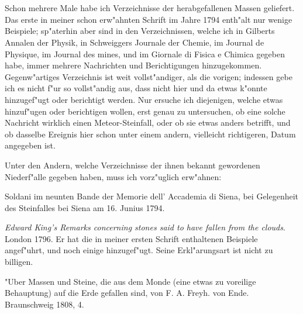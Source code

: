 \documentclass[a4paper, 11pt, oneside, polutonikogreek, german]{article}
\begin{document}
\section{}
\paragraph{}
\subsection{}
\paragraph{}
Schon mehrere Male habe ich Verzeichnisse der herabgefallenen Massen geliefert. Das erste in meiner schon erw"ahnten Schrift im Jahre 1794 enth"alt nur wenige Beispiele; sp"aterhin aber sind in den Verzeichnissen, welche ich in Gilberts Annalen der Physik, in Schweiggers Journale der Chemie, im Journal de Physique, im Journal des mines, und im Giornale di Fisica e Chimica gegeben habe, immer mehrere Nachrichten und Berichtigungen hinzugekommen. Gegenw"artiges Verzeichnis ist weit vollst"andiger, als die vorigen; indessen gebe ich es nicht f"ur so vollst"andig aus, dass nicht hier und da etwas k"onnte hinzugef"ugt oder berichtigt werden. Nur ersuche ich diejenigen, welche etwas hinzuf"ugen oder berichtigen wollen, erst genau zu untersuchen, ob eine solche Nachricht wirklich einen Meteor-Steinfall, oder ob sie etwas anders betrifft, und ob dasselbe Ereignis hier schon unter einem andern, vielleicht richtigeren, Datum angegeben ist.

Unter den Andern, welche Verzeichnisse der ihnen bekannt gewordenen Niederf"alle gegeben haben, muss ich vorz"uglich erw"ahnen:

Soldani im neunten Bande der Memorie dell' Accademia di Siena, bei Gelegenheit des Steinfalles bei Siena am 16. Junius 1794.

\emph{Edward King's Remarks concerning stones said to have fallen from the clouds}. London 1796. Er hat die in meiner ersten Schrift enthaltenen Beispiele angef"uhrt, und noch einige hinzugef"ugt. Seine Erkl"arungsart ist nicht zu billigen.

"Uber Massen und Steine, die aus dem Monde (eine etwas zu voreilige Behauptung) auf die Erde gefallen sind, von F. A. Freyh. von Ende. Braunschweig 1808, 4.
\end{document}

